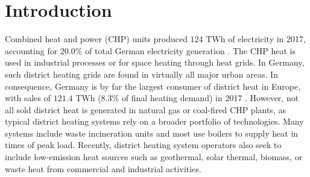 \documentclass[preprint, 12pt, authoryear]{elsarticle}
\begin{document}
\section{Introduction} \label{intro}
Combined heat and power (CHP) units produced $124$ TWh of electricity in 2017, accounting for $20.0\%$ of total German electricity generation \citep{AGEB2018a}. 
The CHP heat is used in industrial processes or for space heating through heat grids. In Germany, such district heating grids are found in virtually all major urban areas. 
In consequence, Germany is by far the largest consumer of district heat in Europe, with sales of $121.4$ TWh ($8.3\%$ of final heating demand) in 2017 \citep{AGEB2018b}. 
However, not all sold district heat is generated in natural gas or coal-fired CHP plants, as typical district heating systems rely on a broader portfolio of technologies. 
Many systems include waste incineration units and most use boilers to supply heat in times of peak load. 
Recently, district heating system operators also seek to include low-emission heat sources such as geothermal, solar thermal, biomass, or waste heat from commercial and industrial activities.
\end{document}
